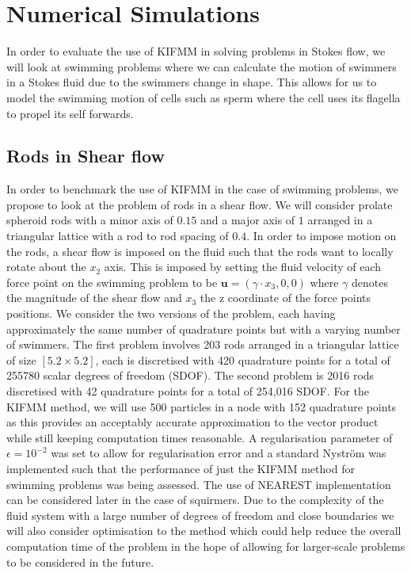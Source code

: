 \FloatBarrier
\section{Numerical Simulations} \label{sec:NumericalSims}
In order to evaluate the use of KIFMM in solving problems in Stokes flow, we will look at swimming problems where we can calculate the motion of swimmers in a Stokes fluid due to the swimmers change in shape. This allows for us to model the swimming motion of cells such as sperm \cite{Gallagher2020,Gallagher2018MeshfreeCells} where the cell uses its flagella to propel its self forwards.



\subsection{Rods in Shear flow}
In order to benchmark the use of KIFMM in the case of swimming problems, we propose to look at the problem of rods in a shear flow. We will consider prolate spheroid rods with a minor axis of $0.15$ and a major axis of $1$ arranged in a triangular lattice with a rod to rod spacing of $0.4$. In order to impose motion on the rods, a shear flow is imposed on the fluid such that the rods want to locally rotate about the $x_2$ axis. This is imposed by setting the fluid velocity of each force point on the swimming problem to be $\bm{u} = (\gamma\cdot x_3,0,0)$ where $\gamma$ denotes the magnitude of the shear flow and $x_3$ the z coordinate of the force points positions. We consider the two versions of the problem, each having approximately the same number of quadrature points but with a varying number of swimmers. The first problem involves 203 rods arranged in a triangular lattice of size $[5.2 \times 5.2]$, each is discretised with 420 quadrature points for a total of 255780 scalar degrees of freedom (SDOF). The second problem is 2016 rods discretised with 42 quadrature points for a total of 254,016 SDOF.  For the KIFMM method, we will use 500 particles in a node with 152 quadrature points as this provides an acceptably accurate approximation to the vector product while still keeping computation times reasonable. A regularisation parameter of $\epsilon=10^{-2}$ was set to allow for regularisation error and a standard Nyström was implemented such that the performance of just the KIFMM method for swimming problems was being assessed. The use of NEAREST implementation can be considered later in the case of squirmers. Due to the complexity of the fluid system with a large number of degrees of freedom and close boundaries we will also consider optimisation to the method which could help reduce the overall computation time of the problem in the hope of allowing for larger-scale problems to be considered in the future. 


